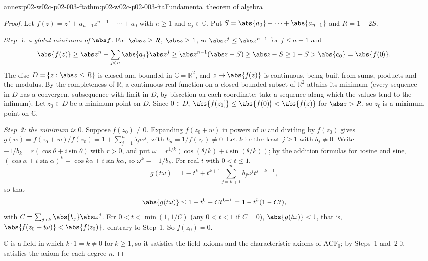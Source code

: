 \begin{annexitem}{annex:p02-w02c-p02-003-fta}{thm:p02-w02c-p02-003-fta}{Fundamental theorem of algebra}
\begin{proof}
Let \(f(z)=z^n+a_{n-1}z^{n-1}+\cdots+a_0\) with \(n\geq1\) and
\(a_j\in\mathbb C\).  Put \(S=\abs{a_0}+\cdots+\abs{a_{n-1}}\) and
\(R=1+2S\).

\emph{Step~1: a global minimum of \(\abs f\).}  For \(\abs z\geq R\),
\(\abs z\geq1\), so \(\abs z^j\leq\abs z^{n-1}\) for \(j\leq n-1\) and
\[
 \abs{f(z)}\geq\abs z^n-\sum_{j<n}\abs{a_j}\abs z^j
 \geq\abs z^{n-1}(\abs z-S)\geq\abs z-S\geq1+S>\abs{a_0}=\abs{f(0)}.
\]
The disc \(D=\{z:\abs z\leq R\}\) is closed and bounded in
\(\mathbb C=\mathbb R^2\), and \(z\mapsto\abs{f(z)}\) is continuous, being
built from sums, products and the modulus.  By the completeness of
\(\mathbb R\), a continuous real function on a closed bounded subset of
\(\mathbb R^2\) attains its minimum (every sequence in \(D\) has a
convergent subsequence with limit in \(D\), by bisection on each
coordinate; take a sequence along which the values tend to the infimum).
Let \(z_0\in D\) be a minimum point on \(D\).  Since \(0\in D\),
\(\abs{f(z_0)}\leq\abs{f(0)}<\abs{f(z)}\) for \(\abs z>R\), so \(z_0\) is
a minimum point on \(\mathbb C\).

\emph{Step~2: the minimum is \(0\).}  Suppose \(f(z_0)\neq0\).  Expanding
\(f(z_0+w)\) in powers of \(w\) and dividing by \(f(z_0)\) gives
\(g(w)=f(z_0+w)/f(z_0)=1+\sum_{j=1}^nb_jw^j\), with \(b_n=1/f(z_0)\neq0\).
Let \(k\) be the least \(j\geq1\) with \(b_j\neq0\).  Write
\(-1/b_k=r(\cos\theta+i\sin\theta)\) with \(r>0\), and put
\(\omega=r^{1/k}(\cos(\theta/k)+i\sin(\theta/k))\); by the addition
formulas for cosine and sine, \((\cos\alpha+i\sin\alpha)^k=\cos
k\alpha+i\sin k\alpha\), so \(\omega^k=-1/b_k\).  For real \(t\) with
\(0<t\leq1\),
\[
 g(t\omega)=1-t^k+t^{k+1}\sum_{j=k+1}^nb_j\omega^jt^{j-k-1},
\]
so that
\[
 \abs{g(t\omega)}\leq1-t^k+Ct^{k+1}=1-t^k(1-Ct),
\]
with \(C=\sum_{j>k}\abs{b_j}\abs\omega^j\).  For \(0<t<\min(1,1/C)\)
(any \(0<t<1\) if \(C=0\)), \(\abs{g(t\omega)}<1\), that is,
\(\abs{f(z_0+t\omega)}<\abs{f(z_0)}\), contrary to Step~1.  So
\(f(z_0)=0\).

\(\mathbb C\) is a field in which \(k\cdot1=k\neq0\) for \(k\geq1\), so it
satisfies the field axioms and the characteristic axioms of
\(\mathrm{ACF}_0\); by Steps~1 and~2 it satisfies the axiom for each
degree \(n\).
\end{proof}
\end{annexitem}

